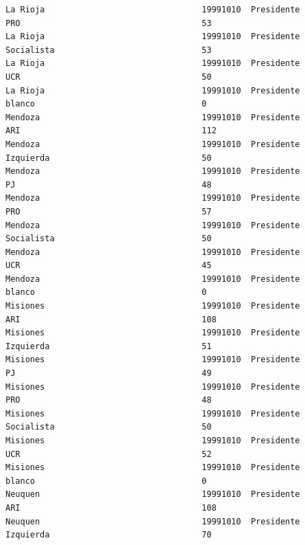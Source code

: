 \documentclass[a4paper,10pt]{article}
\begin{document}
\begin{verbatim}
La Rioja                                19991010  Presidente                    PRO                                     53             
La Rioja                                19991010  Presidente                    Socialista                              53             
La Rioja                                19991010  Presidente                    UCR                                     50             
La Rioja                                19991010  Presidente                    blanco                                  0              
Mendoza                                 19991010  Presidente                    ARI                                     112            
Mendoza                                 19991010  Presidente                    Izquierda                               50             
Mendoza                                 19991010  Presidente                    PJ                                      48             
Mendoza                                 19991010  Presidente                    PRO                                     57             
Mendoza                                 19991010  Presidente                    Socialista                              50             
Mendoza                                 19991010  Presidente                    UCR                                     45             
Mendoza                                 19991010  Presidente                    blanco                                  0              
Misiones                                19991010  Presidente                    ARI                                     108            
Misiones                                19991010  Presidente                    Izquierda                               51             
Misiones                                19991010  Presidente                    PJ                                      49             
Misiones                                19991010  Presidente                    PRO                                     48             
Misiones                                19991010  Presidente                    Socialista                              50             
Misiones                                19991010  Presidente                    UCR                                     52             
Misiones                                19991010  Presidente                    blanco                                  0              
Neuquen                                 19991010  Presidente                    ARI                                     108            
Neuquen                                 19991010  Presidente                    Izquierda                               70             

\end{verbatim}
\end{document}
